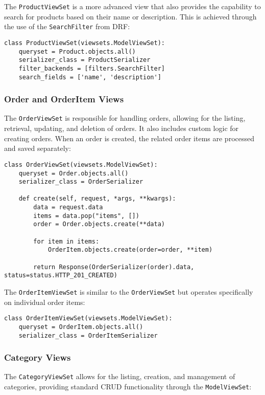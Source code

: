 The \texttt{ProductViewSet} is a more advanced view that also provides the capability to search for products based on their name or description. This is achieved through the use of the \texttt{SearchFilter} from DRF:

\begin{verbatim}
class ProductViewSet(viewsets.ModelViewSet):
    queryset = Product.objects.all()
    serializer_class = ProductSerializer
    filter_backends = [filters.SearchFilter]
    search_fields = ['name', 'description']
\end{verbatim}

\subsubsection{Order and OrderItem Views}
The \texttt{OrderViewSet} is responsible for handling orders, allowing for the listing, retrieval, updating, and deletion of orders. It also includes custom logic for creating orders. When an order is created, the related order items are processed and saved separately:

\begin{verbatim}
class OrderViewSet(viewsets.ModelViewSet):
    queryset = Order.objects.all()
    serializer_class = OrderSerializer

    def create(self, request, *args, **kwargs):
        data = request.data
        items = data.pop("items", [])
        order = Order.objects.create(**data)

        for item in items:
            OrderItem.objects.create(order=order, **item)

        return Response(OrderSerializer(order).data, status=status.HTTP_201_CREATED)
\end{verbatim}

The \texttt{OrderItemViewSet} is similar to the \texttt{OrderViewSet} but operates specifically on individual order items:

\begin{verbatim}
class OrderItemViewSet(viewsets.ModelViewSet):
    queryset = OrderItem.objects.all()
    serializer_class = OrderItemSerializer
\end{verbatim}

\subsubsection{Category Views}
The \texttt{CategoryViewSet} allows for the listing, creation, and management of categories, providing standard CRUD functionality through the \texttt{ModelViewSet}:

